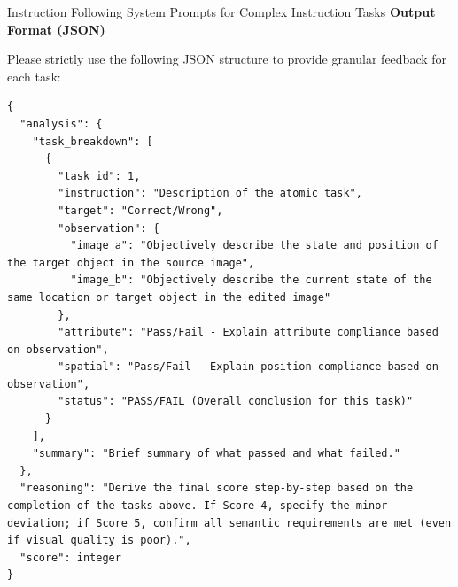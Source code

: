 \begin{promptbox}[label={System Prompts: IF_Complex_Instruction}]{Instruction Following System Prompts for Complex Instruction Tasks}
\textbf{Output Format (JSON)}

Please strictly use the following JSON structure to provide granular feedback for each task:

\begin{lstlisting}
{
  "analysis": {
    "task_breakdown": [
      {
        "task_id": 1,
        "instruction": "Description of the atomic task",
        "target": "Correct/Wrong",
        "observation": {
          "image_a": "Objectively describe the state and position of the target object in the source image",
          "image_b": "Objectively describe the current state of the same location or target object in the edited image"
        },
        "attribute": "Pass/Fail - Explain attribute compliance based on observation",
        "spatial": "Pass/Fail - Explain position compliance based on observation",
        "status": "PASS/FAIL (Overall conclusion for this task)"
      }
    ],
    "summary": "Brief summary of what passed and what failed."
  },
  "reasoning": "Derive the final score step-by-step based on the completion of the tasks above. If Score 4, specify the minor deviation; if Score 5, confirm all semantic requirements are met (even if visual quality is poor).",
  "score": integer
}
\end{lstlisting}


\end{promptbox}


\clearpage

